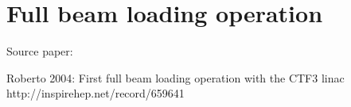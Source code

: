 \section{Full beam loading operation}

Source paper: 

Roberto 2004: First full beam loading operation with the CTF3 linac
http://inspirehep.net/record/659641
